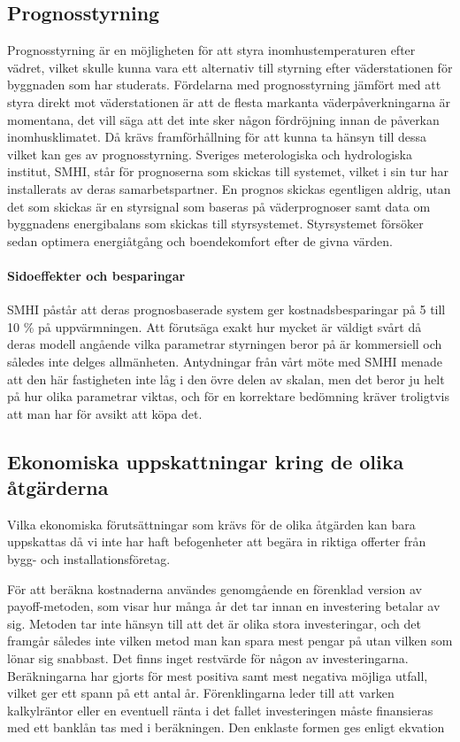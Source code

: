 \subsection{Prognosstyrning}
Prognosstyrning är en möjligheten för att styra inomhustemperaturen efter vädret, vilket skulle kunna vara ett alternativ till styrning efter väderstationen för byggnaden som har studerats.
Fördelarna med prognosstyrning jämfört med att styra direkt mot väderstationen är att de flesta markanta väderpåverkningarna är momentana, det vill säga att det inte sker någon fördröjning innan de påverkan inomhusklimatet. Då krävs framförhållning för att kunna ta hänsyn till dessa vilket kan ges av prognosstyrning. Sveriges meterologiska och hydrologiska institut, SMHI, står för prognoserna som skickas till systemet, vilket i sin tur har installerats av deras samarbetspartner. En prognos skickas egentligen aldrig, utan det som skickas är en styrsignal som baseras på väderprognoser samt data om byggnadens energibalans som skickas till styrsystemet. Styrsystemet försöker sedan optimera energiåtgång och boendekomfort efter de givna värden.

\paragraph{Sidoeffekter och besparingar}
SMHI påstår att deras prognosbaserade system ger kostnadsbesparingar på 5 till 10 \% på uppvärmningen. Att förutsäga exakt hur mycket är väldigt svårt då deras modell angående vilka parametrar styrningen beror på är kommersiell och således inte delges allmänheten. Antydningar från vårt möte med SMHI menade att den här fastigheten inte låg i den övre delen av skalan, men det beror ju helt på hur olika parametrar viktas, och för en korrektare bedömning kräver troligtvis att man har för avsikt att köpa det.

\subsection{Ekonomiska uppskattningar kring de olika åtgärderna}
Vilka ekonomiska förutsättningar som krävs för de olika åtgärden kan bara uppskattas då vi inte har haft befogenheter att begära in riktiga offerter från bygg- och installationsföretag.

För att beräkna kostnaderna användes genomgående en förenklad version av payoff-metoden, som visar hur många år det tar innan en investering betalar av sig. Metoden tar inte hänsyn till att det är olika stora investeringar, och det framgår således inte vilken metod man kan spara mest pengar på utan vilken som lönar sig snabbast. Det finns inget restvärde för någon av investeringarna. Beräkningarna har gjorts för mest positiva samt mest negativa möjliga utfall, vilket ger ett spann på ett antal år. Förenklingarna leder till att varken kalkylräntor eller en eventuell ränta i det fallet investeringen måste finansieras med ett banklån tas med i beräkningen. Den enklaste formen ges enligt ekvation\cite{ind.ek}


